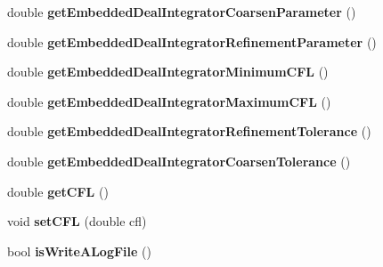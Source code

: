 \begin{DoxyCompactItemize}
\item 
\hypertarget{classnatrium_1_1SolverConfiguration_a0e233c5ac8c6387bf31923700fd95b56}{
double {\bfseries getEmbeddedDealIntegratorCoarsenParameter} ()}
\label{classnatrium_1_1SolverConfiguration_a0e233c5ac8c6387bf31923700fd95b56}

\item 
\hypertarget{classnatrium_1_1SolverConfiguration_a9f8fda7b80e405dab21388cdb0eacbbe}{
double {\bfseries getEmbeddedDealIntegratorRefinementParameter} ()}
\label{classnatrium_1_1SolverConfiguration_a9f8fda7b80e405dab21388cdb0eacbbe}

\item 
\hypertarget{classnatrium_1_1SolverConfiguration_a6c15ce0e57ef59f292907e779f7e371a}{
double {\bfseries getEmbeddedDealIntegratorMinimumCFL} ()}
\label{classnatrium_1_1SolverConfiguration_a6c15ce0e57ef59f292907e779f7e371a}

\item 
\hypertarget{classnatrium_1_1SolverConfiguration_a0116178f32e79bc60e115135becba20d}{
double {\bfseries getEmbeddedDealIntegratorMaximumCFL} ()}
\label{classnatrium_1_1SolverConfiguration_a0116178f32e79bc60e115135becba20d}

\item 
\hypertarget{classnatrium_1_1SolverConfiguration_a2c6da5cc4bcfc653c0f3b93b57a4ddf5}{
double {\bfseries getEmbeddedDealIntegratorRefinementTolerance} ()}
\label{classnatrium_1_1SolverConfiguration_a2c6da5cc4bcfc653c0f3b93b57a4ddf5}

\item 
\hypertarget{classnatrium_1_1SolverConfiguration_afedfb3328b78940a7e929214c6d08741}{
double {\bfseries getEmbeddedDealIntegratorCoarsenTolerance} ()}
\label{classnatrium_1_1SolverConfiguration_afedfb3328b78940a7e929214c6d08741}

\item 
\hypertarget{classnatrium_1_1SolverConfiguration_ae5991b39b24428e10baf44778d5a984f}{
double {\bfseries getCFL} ()}
\label{classnatrium_1_1SolverConfiguration_ae5991b39b24428e10baf44778d5a984f}

\item 
\hypertarget{classnatrium_1_1SolverConfiguration_a91699424349ebb691788cb053ca08da1}{
void {\bfseries setCFL} (double cfl)}
\label{classnatrium_1_1SolverConfiguration_a91699424349ebb691788cb053ca08da1}

\item 
\hypertarget{classnatrium_1_1SolverConfiguration_ac97dc43684f8a690de0f3e9c132dda02}{
bool {\bfseries isWriteALogFile} ()}
\label{classnatrium_1_1SolverConfiguration_ac97dc43684f8a690de0f3e9c132dda02}


\end{DoxyCompactItemize}

